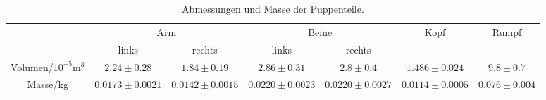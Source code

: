 \begin{table}[p]
	\centering
	\begin{tabular}{ccccccc}
	\toprule
	&\multicolumn{2}{c}{Arm} & \multicolumn{2}{c}{Beine}  & {Kopf} & {Rumpf}\\
	&{links} &{rechts} &{links} &{rechts} &{} & {}\\
	\midrule
	Volumen/$10^{-5}\si{\meter\cubed}$&$2.24 \pm0.28$ &$1.84 \pm0.19$&$2.86 \pm0.31 $&$2.8 \pm0.4 $&$1.486 \pm0.024$ &$9.8 \pm0.7$\\
	Masse/\si{\kilo\gram} &$0.0173 \pm0.0021$&$0.0142 \pm0.0015$&$0.0220 \pm0.0023$&$0.0220 \pm0.0027$&$0.0114 \pm0.0005$&$0.076 \pm0.004$\\
	\bottomrule
	\end{tabular}
	\caption{Abmessungen und Masse der Puppenteile.}
	\label{tab:M6 Puppenteile}	
\end{table}
